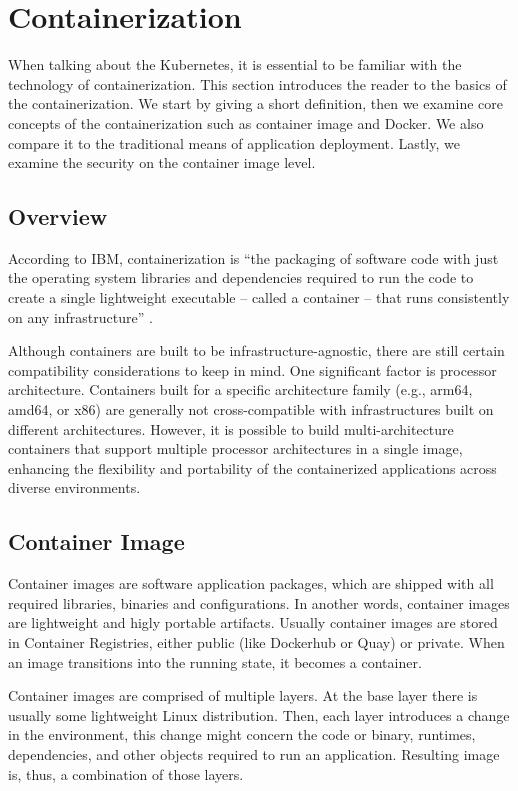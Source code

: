 \section{Containerization}

When talking about the Kubernetes, it is essential to be familiar with the technology of containerization. This section introduces the reader to the basics of the containerization. We start by giving a short definition, then we examine core concepts of the containerization such as container image and Docker. We also compare it to the traditional means of application deployment. Lastly, we examine the security on the container image level.

\subsection{Overview}

According to IBM, containerization is ``the packaging of software code with just the operating system libraries and dependencies required to run the code to create a single lightweight executable -- called a container -- that runs consistently on any infrastructure'' \cite{ibm-containerization}.

Although containers are built to be infrastructure-agnostic, there are still certain compatibility considerations to keep in mind. One significant factor is processor architecture. Containers built for a specific architecture family (e.g., arm64, amd64, or x86) are generally not cross-compatible with infrastructures built on different architectures. However, it is possible to build multi-architecture containers that support multiple processor architectures in a single image, enhancing the flexibility and portability of the containerized applications across diverse environments.

\subsection{Container Image}

Container images are software application packages, which are shipped with all required libraries, binaries and configurations. In another words, container images are lightweight and higly portable artifacts. Usually container images are stored in Container Registries, either public (like Dockerhub or Quay) or private. When an image transitions into the running state, it becomes a container.

Container images are comprised of multiple layers. At the base layer there is usually some lightweight Linux distribution. Then, each layer introduces a change in the environment, this change might concern the code or binary, runtimes, dependencies, and other objects required to run an application. Resulting image is, thus, a combination of those layers.

